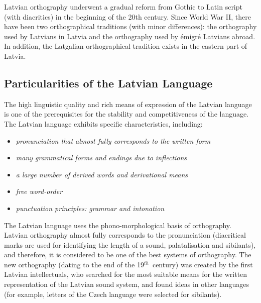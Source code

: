 \begin{multicols}{2}
Latvian orthography underwent a gradual reform from Gothic to Latin script (with diacritics) in the beginning of the 20th century.
Since World War II, there have been two orthographical traditions (with minor differences): the orthography used by Latvians in Latvia and the orthography used by émigré Latvians abroad.
In addition, the Latgalian orthographical tradition exists in the eastern part of Latvia.

\subsection{Particularities of the Latvian Language}
The high linguistic quality and rich means of expression of the Latvian language is one of the prerequisites for the stability and competitiveness of the language.
The Latvian language exhibits specific characteristics, including:

\begin{itemize}
\item  \textit{pronunciation that almost fully corresponds to the written form}
\item \textit{ many grammatical forms and endings due to inflections }
\item \textit{ a large number of derived words and derivational means}
\item \textit{ free word-order}
\item \textit{ punctuation principles: grammar and intonation}
\end{itemize}

The Latvian language uses the phono-morphological basis of orthography.
Latvian orthography almost fully corresponds to the pronunciation (diacritical marks are used for identifying the length of a sound, palatalisation and sibilants), and therefore, it is considered to be one of the best systems of orthography.
The new orthography (dating to the end of the 19${}^{th}$~century) was created by the first Latvian intellectuals, who searched for the most suitable means for the written representation of the Latvian sound system, and found ideas in other languages (for example, letters of the Czech language were selected for sibilants).



\end{multicols}
